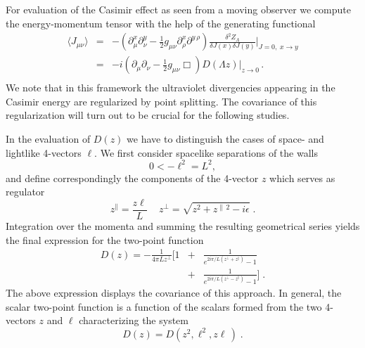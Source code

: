 \documentclass[a4paper,twocolumn,eqsecnum,aps]{revtex4}
\begin{document}
For evaluation of the Casimir effect as seen from a moving observer we compute 
the energy-momentum tensor with the help of the generating functional 
\begin{eqnarray}
 \label{emt}
\langle J_{\mu\nu}\rangle &=& -(\partial_{\mu}^{x}\partial_{\nu}^{y}-\frac{1}{2}
g_{\mu\nu}\partial_{\rho}^{x}\partial^{y\,\rho})\frac{\delta ^{2}Z_{\Lambda}}
{\delta J(x)\delta J (y)}\Big|_{J = 0,\; x \rightarrow y}\nonumber\\ &=& 
-i(\partial_{\mu}\partial_{\nu}-\frac{1}{2}g_{\mu\nu} \Box)
D(\Lambda z)\Big|_{z \rightarrow 0} \, . \, \nonumber\\ 
\end{eqnarray}
We note that in this framework the ultraviolet divergencies appearing in the Casimir energy are regularized by point splitting.  The covariance of this regularization  will turn out to be  crucial for the following  studies.


 In the evaluation of  $D(z)$ we have to distinguish the cases of space- and lightlike 4-vectors $\ell$.  We first consider spacelike separations of the walls 
 \begin{equation}
  \label{subst}
0<  -\ell^2 = L^{2} ,  
\end{equation}
and define correspondingly the components of the 4-vector $z$ which serves as regulator
\begin{equation}
  \label{coz}
 z^{\|}= \frac{ z\ell }{L} \,\quad z^{\perp} = \sqrt{z^{2}+z^{\|\, 2}-i\epsilon} \;.  
\end{equation} 
  Integration over the momenta and summing the resulting geometrical series  yields the final expression for the two-point function  
\begin{eqnarray}
\label{DL}
  D (z) =  - \frac{1}{4\pi L z^{\perp}}\Big [ 1 &+&
\frac{1}{ e^{2i \pi /L (z^{\perp} + z^{\|}) }-1} \nonumber\\ &+& 
\frac{1}{ e^{2i \pi /L (z^{\perp} -  z^{\|}) }-1}\Big]\; .
\end{eqnarray}
The above expression displays the covariance of this approach. In general,  the scalar two-point function is a function of the scalars formed from the two 4-vectors $z$ and $\ell $ characterizing the system
\begin{equation}
  \label{invd}
  D(z)= D(z^2,\ell ^2, z\ell\, )\;. 
\end{equation}


\end{document}
